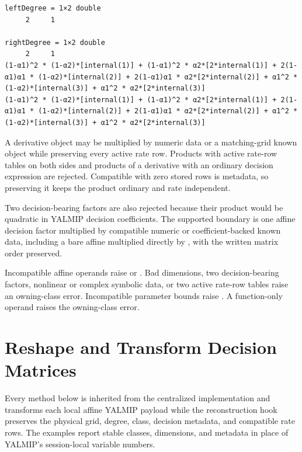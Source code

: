 \begin{lstlisting}[style=dpwideoutput]
leftDegree = 1×2 double
     2     1

rightDegree = 1×2 double
     2     1
(1-α1)^2 * (1-α2)*[internal(1)] + (1-α1)^2 * α2*[2*internal(1)] + 2(1-α1)α1 * (1-α2)*[internal(2)] + 2(1-α1)α1 * α2*[2*internal(2)] + α1^2 * (1-α2)*[internal(3)] + α1^2 * α2*[2*internal(3)]
(1-α1)^2 * (1-α2)*[internal(1)] + (1-α1)^2 * α2*[2*internal(1)] + 2(1-α1)α1 * (1-α2)*[internal(2)] + 2(1-α1)α1 * α2*[2*internal(2)] + α1^2 * (1-α2)*[internal(3)] + α1^2 * α2*[2*internal(3)]
\end{lstlisting}

A derivative object may be multiplied by numeric data or a matching-grid known object while preserving every active rate row. Products with active rate-row tables on both sides and products of a derivative with an ordinary decision expression are rejected. Compatible  with zero stored rows is metadata, so preserving it keeps the product ordinary and rate independent.

Two decision-bearing factors are also rejected because their product would be quadratic in YALMIP decision coefficients. The supported boundary is one affine decision factor multiplied by compatible numeric or coefficient-backed known data, including a bare affine  multiplied directly by , with the written matrix order preserved.

\remarkshead
Incompatible affine operands raise  or . Bad dimensions, two decision-bearing factors, nonlinear or complex symbolic data, or two active rate-row tables raise an owning-class  error. Incompatible parameter bounds raise . A function-only  operand raises the owning-class  error.

\section{Reshape and Transform Decision Matrices}
\label{sec:pdvar-matrix-ops}

Every method below is inherited from the centralized  implementation and transforms each local affine YALMIP payload while the  reconstruction hook preserves the physical grid, degree, class, decision metadata, and compatible rate rows. The examples report stable classes, dimensions, and metadata in place of YALMIP's session-local variable numbers.

